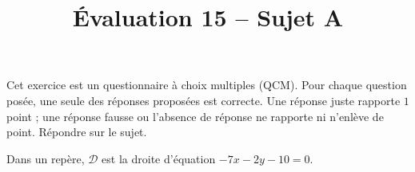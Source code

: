 \documentclass[a4paper]{article}
\begin{document}
\title{Évaluation 15 -- Sujet A}

\pagestyle{empty}

\date{}
\author{}

\maketitle{}

\thispagestyle{empty}

\exo[6 points] Cet exercice est un questionnaire à choix multiples (QCM). Pour chaque question posée, une seule des réponses proposées est correcte. Une réponse juste rapporte $1$ point ; une réponse fausse ou l'absence de réponse ne rapporte ni n'enlève de point. Répondre sur le sujet.

\medskip

Dans un repère, $\mathcal{D}$ est la droite d'équation $-7x-2y-10=0$.
\end{document}
